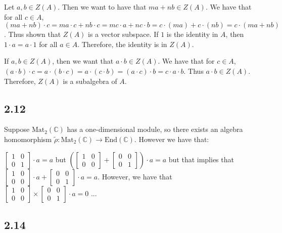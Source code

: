 \documentclass[]{article}
\begin{document}
Let $a, b \in Z(A)$. Then we want to have that $ma + nb \in Z(A)$. We have that for all $c \in A$, $(ma + nb) \cdot c = ma \cdot c + nb \cdot c = m c \cdot a + n c \cdot b = c \cdot (ma) + c \cdot (nb) = c \cdot (ma + nb)$. Thus shown that $Z(A)$ is a vector subspace.
If $1$ is the identity in $A$, then $1 \cdot a = a \cdot 1$ for all $a \in A$. Therefore, the identity is in $Z(A)$.

If $a, b \in Z(A)$, then we want that $a \cdot b \in Z(A)$. We have that for $c \in A$, $(a \cdot b) \cdot c = a \cdot ( b \cdot c) = a \cdot (c \cdot b) = (a \cdot c) \cdot b = c \cdot a \cdot b$. Thus $a \cdot b \in Z(A)$. 
Therefore, $Z(A)$ is a subalgebra of $A$. 

\subsection*{2.12}
Suppose $\text{Mat}_2(\mathbb{C})$ has a one-dimensional module, so there exists an algebra homomorphism $\tilde{\rho} : \text{Mat}_2(\mathbb{C}) \rightarrow \text{End}(\mathbb{C})$. However we have that:

$
\begin{bmatrix}
	1 & 0 \\
	0 & 1 
\end{bmatrix}
\cdot a = a$
but 
$
\left(\begin{bmatrix}
	1 & 0 \\
	0 & 0 
\end{bmatrix} + \begin{bmatrix}
0 & 0 \\
0 & 1 
\end{bmatrix}\right)
\cdot a = a$
but that implies that
$
\begin{bmatrix}
	1 & 0 \\
	0 & 0 
\end{bmatrix} \cdot a + \begin{bmatrix}
	0 & 0 \\
	0 & 1 
\end{bmatrix}
\cdot a= a$.
However, we have that 
$
\begin{bmatrix}
	1 & 0 \\
	0 & 0 
\end{bmatrix} \times \begin{bmatrix}
	0 & 0 \\
	0 & 1 
\end{bmatrix}
\cdot a = 0$
...
\subsection*{2.14}
\end{document}
